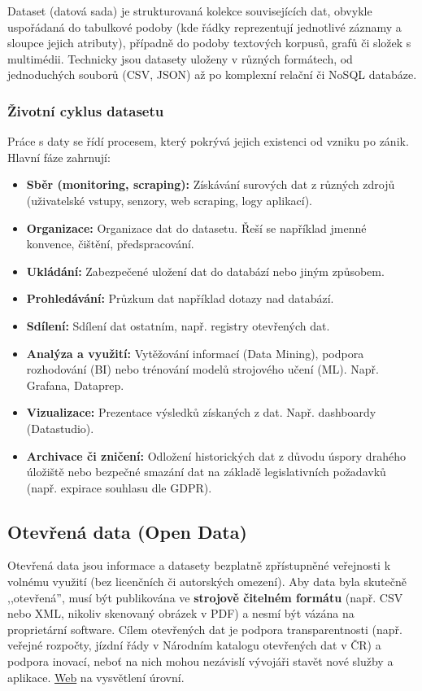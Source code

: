 Dataset (datová sada) je strukturovaná kolekce souvisejících dat, obvykle uspořádaná do tabulkové podoby (kde řádky reprezentují jednotlivé záznamy a sloupce jejich atributy), případně do podoby textových korpusů, grafů či složek s multimédii. Technicky jsou datasety uloženy v různých formátech, od jednoduchých souborů (CSV, JSON) až po komplexní relační či NoSQL databáze.

\subsubsection*{Životní cyklus datasetu}
Práce s daty se řídí procesem, který pokrývá jejich existenci od vzniku po zánik. Hlavní fáze zahrnují:
\begin{itemize}
    \item \textbf{Sběr (monitoring, scraping):} Získávání surových dat z různých zdrojů (uživatelské vstupy, senzory, web scraping, logy aplikací).
    \item \textbf{Organizace:} Organizace dat do datasetu. Řeší se například jmenné konvence, čištění, předspracování.
    \item \textbf{Ukládání:} Zabezpečené uložení dat do databází nebo jiným způsobem.
    \item \textbf{Prohledávání:} Průzkum dat například dotazy nad databází.
    \item \textbf{Sdílení:} Sdílení dat ostatním, např. registry otevřených dat.
    \item \textbf{Analýza a využití:} Vytěžování informací (Data Mining), podpora rozhodování (BI) nebo trénování modelů strojového učení (ML). Např. Grafana, Dataprep.
    \item \textbf{Vizualizace:} Prezentace výsledků získaných z dat. Např. dashboardy (Datastudio).
    \item \textbf{Archivace či zničení:} Odložení historických dat z důvodu úspory drahého úložiště nebo bezpečné smazání dat na základě legislativních požadavků (např. expirace souhlasu dle GDPR).
\end{itemize}

\subsection{Otevřená data (Open Data)}
Otevřená data jsou informace a datasety bezplatně zpřístupněné veřejnosti k volnému využití (bez licenčních či autorských omezení). Aby data byla skutečně ,,otevřená'', musí být publikována ve \textbf{strojově čitelném formátu} (např. CSV nebo XML, nikoliv skenovaný obrázek v PDF) a nesmí být vázána na proprietární software.
Cílem otevřených dat je podpora transparentnosti (např. veřejné rozpočty, jízdní řády v Národním katalogu otevřených dat v ČR) a podpora inovací, neboť na nich mohou nezávislí vývojáři stavět nové služby a aplikace.
\href{https://5stardata.info/cs/}{Web} na vysvětlení úrovní.

